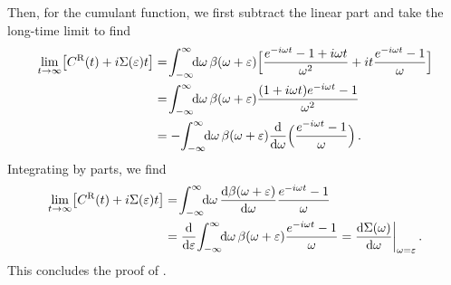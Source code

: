 \documentclass[
    reprint, onecolumn,
    aps,prx,11pt,tightenlines,amsmath,amssymb,
    longbibliography,superscriptaddress,citeautoscript,
    preprintnumbers,nofootinbib]{revtex4-2}
\begin{document}
Then, for the cumulant function, we first subtract the linear part and take the long-time limit to find
\begin{align}
    \lim_{t \to \infty} \bigl[ C^{\rm R}(t) + i \Sigma(\veps) t \bigr]
    &= \nbint{-\infty}{\infty} \dd\omega \, \beta(\omega + \veps) 
    \Bigl[ \frac{e^{-i\omega t} - 1 + i\omega t}{\omega^2} 
    + it \frac{e^{-i\omega t} - 1}{\omega}
    \Bigr]
    \nnnl
    &= \nbint{-\infty}{\infty} \dd\omega \, \beta(\omega + \veps) 
    \frac{(1 + i \omega t) e^{-i\omega t} - 1}{\omega^2}
    \nnnl
    &= - \nbint{-\infty}{\infty} \dd\omega \, \beta(\omega + \veps) 
    \frac{\dd}{\dd\omega} \Bigl( \frac{e^{-i\omega t} - 1}{\omega} \Bigr) \,.
\end{align}
Integrating by parts, we find
\begin{align}
    \lim_{t \to \infty} \bigl[ C^{\rm R}(t) + i \Sigma(\varepsilon) t \bigr]
    &= \!\int_{-\infty}^{\infty}\!\! {\mathrm{d}}\omega \, \frac{{\mathrm{d}} \beta(\omega + \varepsilon)}{{\mathrm{d}} \omega}
    \frac{e^{-i\omega t} - 1}{\omega}
    \nonumber \\
    &= \frac{{\mathrm{d}}}{{\mathrm{d}} \varepsilon} \!\int_{-\infty}^{\infty}\!\! {\mathrm{d}}\omega \, \beta(\omega + \varepsilon)
    \frac{e^{-i\omega t} - 1}{\omega}
    = \frac{{\mathrm{d}} \Sigma(\omega) }{{\mathrm{d}} \omega} \biggr|_{\omega = \varepsilon} \,.
\end{align}
This concludes the proof of .

\FloatBarrier  %

\end{document}
